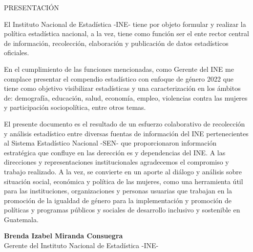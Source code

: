 $\ $\\[3cm]
\begin{center}
{\Bold \LARGE PRESENTACIÓN}\\[2cm]
\end{center}

El Instituto Nacional de Estadística -INE- tiene por objeto formular y realizar la política estadística nacional, a la vez, tiene como función ser el ente rector central de información, recolección, elaboración y publicación de datos estadísticos oficiales.  

En el cumplimiento de las funciones mencionadas, como Gerente del INE me complace presentar el compendio estadístico con enfoque de género 2022 que tiene como objetivo visibilizar estadísticas y una caracterización en los ámbitos de: demografía, educación, salud, economía, empleo, violencias contra las mujeres y participación sociopolítica, entre otros temas. 

El presente documento es el resultado de un esfuerzo colaborativo de recolección y análisis estadístico entre diversas fuentas de información del INE pertenecientes al Sistema Estadístico Nacional -SEN- que proporcionaron información estratégica que confluye en las derección es y dependencias del INE. A las direcciones y representaciones institucionales agradecemos el compromiso y trabajo realizado. A la vez, se convierte en un aporte al diálogo y análisis sobre situación social, económica y política de las mujeres, como una herramienta útil para las instituciones, organizaciones y personas usuarias que trabajan en la promoción de la igualdad de género para la implementación y promoción de políticas y programas públicos y sociales de desarrollo inclusivo y sostenible en Guatemala.\\[1cm]

\begin{center}
\textbf{Brenda Izabel Miranda Consuegra}\\[0.2cm]
Gerente del Instituto Nacional de Estadística -INE-
\end{center}

